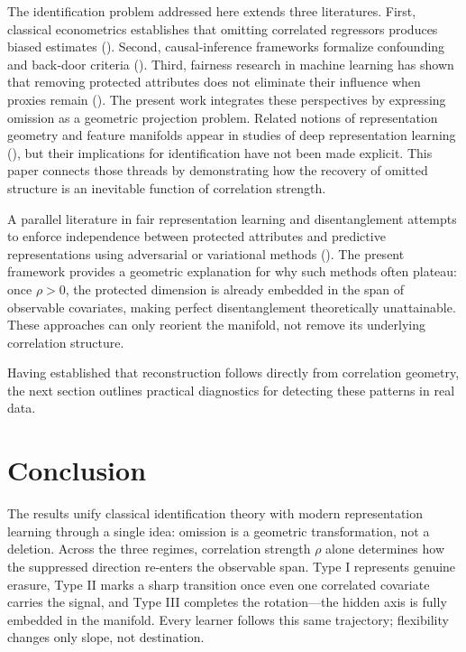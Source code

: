 \documentclass[11pt]{article}
\begin{document}
The identification problem addressed here extends three literatures.
First, classical econometrics establishes that omitting correlated regressors produces biased estimates
(\citealp{angrist2009mostly, wooldridge2010econometric}).
Second, causal‐inference frameworks formalize confounding and back‐door criteria
(\citealp{pearl2009causality, imbens2015causal}).
Third, fairness research in machine learning has shown that removing protected attributes
does not eliminate their influence when proxies remain
(\citealp{dwork2012fairness, barocas2016big, mehrabi2021survey}).
The present work integrates these perspectives
by expressing omission as a geometric projection problem.
Related notions of representation geometry and feature manifolds
appear in studies of deep representation learning
(\citealp{bengio2013representation, bietti2021learning}),
but their implications for identification have not been made explicit.
This paper connects those threads by demonstrating
how the recovery of omitted structure is an inevitable function of correlation strength.

A parallel literature in fair representation learning and disentanglement 
attempts to enforce independence between protected attributes and predictive representations
using adversarial or variational methods 
(\citealp{zhang2018mitigating,beutel2017data,locatello2019challenging}).
The present framework provides a geometric explanation for why such methods often plateau:
once $\rho>0$, the protected dimension is already embedded in the span of observable covariates,
making perfect disentanglement theoretically unattainable.
These approaches can only reorient the manifold, not remove its underlying correlation structure.

Having established that reconstruction follows directly from correlation geometry,
the next section outlines practical diagnostics for detecting these patterns in real data.

\section{Conclusion}
\label{sec:conclusion}

The results unify classical identification theory with modern representation learning through a single idea:
omission is a geometric transformation, not a deletion.
Across the three regimes, correlation strength $\rho$ alone determines how the suppressed direction re-enters the observable span.
Type I represents genuine erasure, Type II marks a sharp transition once even one correlated covariate carries the signal,
and Type III completes the rotation—the hidden axis is fully embedded in the manifold.
Every learner follows this same trajectory; flexibility changes only slope, not destination.
\end{document}
